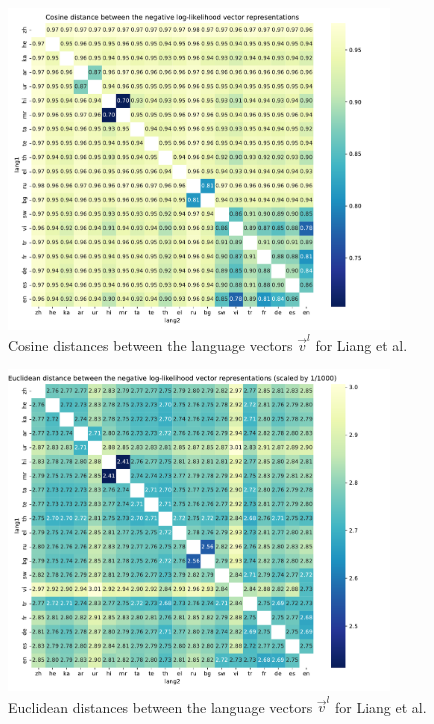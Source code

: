 \begin{figure}[h]
    \centering
    \includegraphics[width=0.9\textwidth]{figures/liang_cosine_distances.pdf}
    \caption{Cosine distances between the language vectors $\vec{v}^l$ for Liang et al.}
    \label{fig:liang_cosine_distances}
\end{figure}

\begin{figure}[h]
    \centering
    \includegraphics[width=0.9\textwidth]{figures/liang_euclid_distances.pdf}
    \caption{Euclidean distances between the language vectors $\vec{v}^l$ for Liang et al.}
    \label{fig:liang_euclid_distances}
\end{figure}


